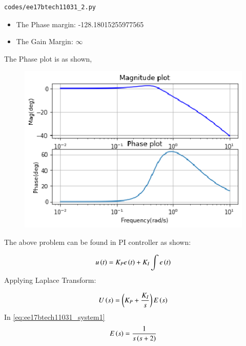 \begin{enumerate}[label=\thesection.\arabic*.,ref=\thesection.\theenumi]
\begin{lstlisting}
codes/ee17btech11031_2.py
\end{lstlisting}
\begin{itemize}
    \item The Phase margin: -128.18015255977565
    \item The Gain Margin: $\infty$
\end{itemize}
%
The Phase plot is as shown,
\begin{figure}[!h]
  \centering
  \includegraphics[width=\columnwidth]{./figs/ee17btech11031_2.eps}
  \caption{}
  \label{fig:ee17btech11031_2}
\end{figure}

The above problem can be found in PI controller as shown:
\begin{figure}[!ht]
	\centering
	\resizebox{\columnwidth}{!}{}
\caption{}
\label{fig:ee17btech11031}
\end{figure}
\begin{align}
    u\left(t\right) = K_{P} e\left(t\right) + K_{I}\int e\left(t\right)
\end{align}
Applying Laplace Transform:
\begin{figure}[!ht]
    \centering
	\resizebox{\columnwidth}{!}{}
\caption{}
\label{fig:ee17btech11031}
\end{figure}
\begin{align}
    U\left(s\right) = \left(K_{P} + \frac{K_{I}}{s}\right)E\left(s\right)
\end{align}
In \eqref{eq:ee17btech11031_system1} 
\begin{align}
    E\left(s\right) = \frac{1}{s\left(s+2\right)}
\end{align} 
\end{enumerate}
